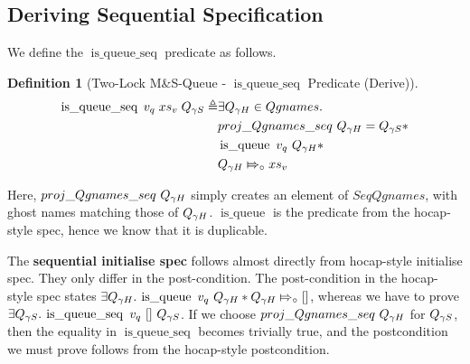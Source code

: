 \documentclass[a4paper, 11pt]{report}
\newtheorem{definition}{Definition}[section]
\newcommand{\isqueue}{\operatorname{is\_queue}}
\newcommand{\isqueueseq}{\operatorname{is\_queue\_seq}}
\newcommand{\abstractstatefullfrag}[2]{#1 \Mapsto_{\circ} #2}
\begin{document}
\subsection{Deriving Sequential Specification}
We define the $\isqueueseq$ predicate as follows.
\begin{definition}[Two-Lock M\&S-Queue - $\isqueueseq$ Predicate (Derive)]\label{TLMSQ:spec:isqueueseq_derive}
\begin{align*}
  \isqueueseq \; v_q \; xs_v \; Q_{\gname S} \eqdef
    &\Exists Q_{\gname H} \in Qgnames .\\
    &proj\_Qgnames\_seq \ Q_{\gname H} = Q_{\gname S} \star\\
    &\isqueue \ v_q \ Q_{\gname H} \star\\
    &\abstractstatefullfrag{Q_{\gname H}}{xs_v}
\end{align*}
\end{definition}

Here, $proj\_Qgnames\_seq \ Q_{\gamma H}$ simply creates an element of $SeqQgnames$, with ghost names matching those of $Q_{\gamma H}$.
$\isqueue$ is the predicate from the hocap-style spec, hence we know that it is duplicable.

The \textbf{sequential initialise spec} follows almost directly from hocap-style initialise spec. They only differ in the post-condition. The post-condition in the hocap-style spec states $\Exists Q_{\gname H} . \isqueue\ v_q \ Q_{\gname H} \star \abstractstatefullfrag{Q_{\gname H}}{[]}$, whereas we have to prove $\Exists Q_{\gname S}. \isqueueseq\ v_q\ []\ Q_{\gname S}$. If we choose $proj\_Qgnames\_seq \ Q_{\gamma H}$ for $Q_{\gamma S}$, then the equality in $\isqueueseq$ becomes trivially true, and the postcondition we must prove follows from the hocap-style postcondition.
\end{document}
